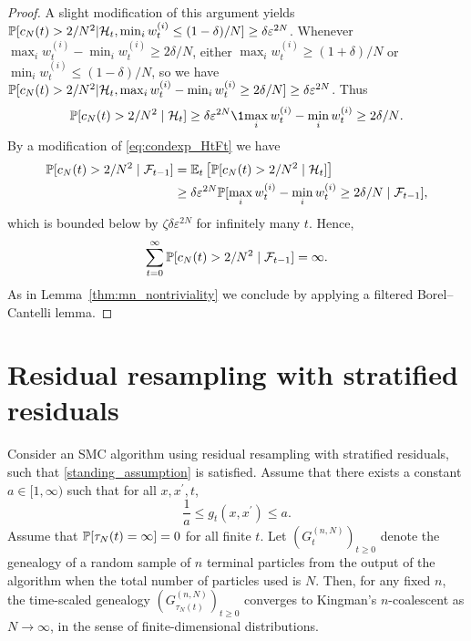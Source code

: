 \begin{proof}
A slight modification of this argument yields $\mathbb{P}[ c_N(t) > 2/N^2 | \mathcal{H}_t, \min_i w_t^{(i)} \leq (1-\delta)/N ] \geq \delta \varepsilon^{2N} $.
Whenever $\max_i w_t^{(i)} - \min_i w_t^{(i)} \geq 2\delta/N$, either $\max_i w_t^{(i)} \geq (1+\delta)/N$ or $\min_i w_t^{(i)} \leq (1-\delta)/N$, so we have 
$\mathbb{P}[ c_N(t) > 2/N^2 | \mathcal{H}_t, \max_i w_t^{(i)} - \min_i w_t^{(i)} \geq 2\delta/N ] \geq \delta \varepsilon^{2N}$.
Thus 
\begin{equation*}
\Prob[ c_N(t)>2/N^2 \mid \mathcal{H}_t ] \geq \delta \varepsilon^{2N}\1{\max_i w_t^{(i)} - \min_i w_t^{(i)} \geq 2\delta/N} .
\end{equation*}
By a modification of \eqref{eq:condexp_HtFt} we have
\begin{align*}
\Prob[ c_N(t)>2/N^2 \mid \mathcal{F}_{t-1} ]
& %
=\Et\left[ \Prob[ c_N(t)>2/N^2 \mid \mathcal{H}_t ] \right] \\
&\geq \delta \varepsilon^{2N} \Prob[ \max_i w_t^{(i)} - \min_i w_t^{(i)} \geq 2\delta/N \mid \mathcal{F}_{t-1} ] ,
\end{align*}
which is bounded below by $ \zeta \delta \varepsilon^{2N} $ for infinitely many $t$. 
Hence,
\begin{equation*}
\sum_{t=0}^\infty \mathbb{P}[ c_N(t) > 2/N^2 \mid \mathcal{F}_{t-1} ] = \infty .
\end{equation*}
As in Lemma~\ref{thm:mn_nontriviality} we conclude by applying a filtered Borel--Cantelli lemma.
\end{proof}





\section{Residual resampling with stratified residuals \seb{$\sim$} }

\begin{corollary}\label{thm:residual_stratified}
Consider an SMC algorithm using residual resampling with stratified residuals, such that \ref{standing_assumption} is satisfied.
Assume that there exists a constant $a\in [1,\infty)$ such that for all $x, x^\prime, t$,
\begin{equation*}
\frac{1}{a} \leq g_t(x, x^\prime) \leq a .
\end{equation*}
Assume that $\mathbb{P}[ \tau_N(t) = \infty] =0$ for all finite $t$.
Let $(G_t^{(n,N)})_{t\geq0}$ denote the genealogy of a random sample of $n$ terminal particles from the output of the algorithm when the total number of particles used is $N$. Then, for any fixed $n$, the time-scaled genealogy $(G_{\tau_N(t)}^{(n,N)})_{t\geq0}$ converges to Kingman's $n$-coalescent as $N\to \infty$, in the sense of finite-dimensional distributions.
\end{corollary}

